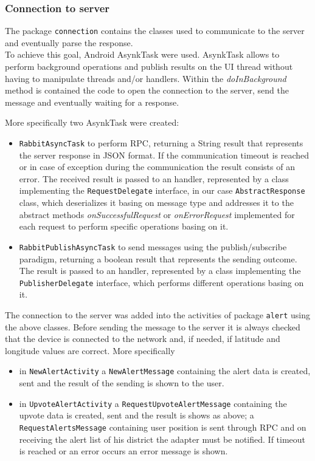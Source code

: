 \documentclass[a4paper,12pt]{report}
\begin{document}
\subsubsection{Connection to server}
The package \texttt{connection} contains the classes used to communicate to the server and eventually parse the response.
\\To achieve this goal, Android AsynkTask were used. AsynkTask allows to perform background operations and publish results on the UI thread without having to manipulate threads and/or handlers. Within the \textit{doInBackground} method is contained the code to open the connection to the server, send the message and eventually waiting for a response.

More specifically two AsynkTask were created:
\begin{itemize}
 \item \texttt{RabbitAsyncTask} to perform RPC, returning a String result that represents the server response in JSON format. If the communication timeout is reached or in case of exception during the communication the result consists of an error. The received result is passed to an handler, represented by a class implementing the \texttt{RequestDelegate} interface, in our case \texttt{AbstractResponse} class, which deserializes it basing on message type and addresses it to the abstract methods \textit{onSuccessfulRequest} or \textit{onErrorRequest} implemented for each request to perform specific operations basing on it.
 \item \texttt{RabbitPublishAsyncTask} to send messages using the publish/subscribe paradigm, returning a boolean result that represents the sending outcome. The result is passed to an handler, represented by a class implementing the \texttt{PublisherDelegate} interface, which performs different operations basing on it.
\end{itemize}
The connection to the server was added into the activities of package \texttt{alert} using the above classes. Before sending the message to the server it is always checked that the device is connected to the network and, if needed, if latitude and longitude values are correct. More specifically
\begin{itemize}
 \item in \texttt{NewAlertActivity} a \texttt{NewAlertMessage} containing the alert data is created, sent and the result of the sending is shown to the user.
 \item in \texttt{UpvoteAlertActivity} a \texttt{RequestUpvoteAlertMessage} containing the upvote data is created, sent and the result is shows as above; a \texttt{RequestAlertsMessage} containing user position is sent through RPC and on receiving the alert list of his district the adapter must be notified. If timeout is reached or an error occurs an error message is shown. 
\end{itemize}
\end{document}
